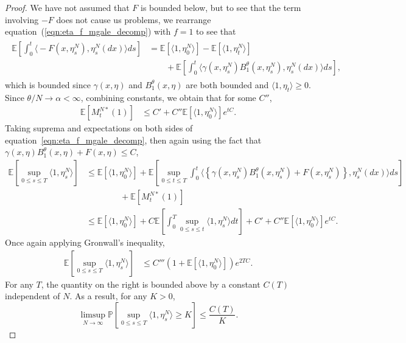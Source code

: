 \documentclass[EJP]{ejpecp} %
\newcommand{\IP}{\mathbb P}
\newcommand{\IE}{\mathbb E}
\begin{document}
\begin{proof}
	We have not assumed that $F$ is bounded below, but to see that the 
	term involving $-F$ does not cause us problems, we rearrange
	equation~(\ref{eqn:eta_f_mgale_decomp}) 
	with $f=1$ to see that
	\begin{align}
		\label{integral of -F}
        \begin{split}
\IE\left[\int_0^t \Big\langle -F(x, \eta^N_s), \eta^N_s(dx) \Big\rangle ds \right]
        &= \IE[\langle 1, \eta^N_0\rangle] -\IE[\langle 1,\eta^N_t\rangle]
            \\&\qquad {}
	+ \IE\left[\int_0^t\Big\langle \gamma(x,\eta_s^N) B^\theta_1(x, \eta_s^N),\eta_s^N(dx)\Big\rangle ds\right],
        \end{split}
	\end{align}
which is bounded since $\gamma (x,\eta)$ and $B^\theta_1(x,\eta)$ are both bounded and 
$\langle 1,\eta_t\rangle\geq 0$. 
    Since $\theta/N \to \alpha < \infty$,
    combining constants, we obtain that for some $C''$,
    \begin{align*}
        \IE\left[ M^{N*}_t(1) \right]
        &\le
        C' + C'' \IE[ \langle 1, \eta_0^N \rangle ] e^{tC} .
    \end{align*}
    Taking suprema and expectations on both sides of equation~\eqref{eqn:eta_f_mgale_decomp},
    then again using the fact that $\gamma(x, \eta) B^\theta_1(x, \eta) + F(x, \eta) \le C$,
    \begin{align*}
        \IE\left[\sup_{0 \le s \le T} \langle 1, \eta^N_s \rangle \right]
        &\le
        \IE[\langle 1, \eta^N_0 \rangle]
        + \IE\left[
            \sup_{0 \le t \le T}
            \int_0^t 
	    \Big\langle\left\{
                \gamma(x, \eta^N_s)
                B^\theta_1(x, \eta^N_s)
                + F(x, \eta^N_s)
            \right\}, \eta^N_s(dx) \Big\rangle ds
        \right]
        \\ & \qquad\qquad {}
        + \IE[M^{N*}_t(1)] 
        \\
        &\le
        \IE[\langle 1, \eta^N_0 \rangle]
        + C \IE\left[
            \int_0^T \sup_{0 \le s \le t} \langle 1, \eta^N_s \rangle dt
        \right]
        + C' + C'' \IE[ \langle 1, \eta_0^N \rangle ] e^{tC} .
    \end{align*}
    Once again applying Gronwall's inequality,
    \begin{align*}
        \IE\left[\sup_{0 \le s \le T} \langle 1, \eta^N_s \rangle \right]
        &\le
        C''' 
        \left(1+ \IE[\langle 1, \eta^N_0 \rangle]\right) e^{2TC} .
    \end{align*}
    For any $T$,
    the quantity on the right is bounded above by a constant $C(T)$ independent of $N$.
    As a result, for any $K > 0$,
    \begin{equation*}
    \limsup_{N \to \infty}
        \IP\left[ \sup_{0 \le s \le T} \langle 1, \eta^{N}_{s} \rangle \geq K \right]
        \leq
        \frac{C(T)}{K}.
    \end{equation*}
\end{proof}
\end{document}
